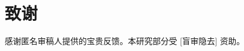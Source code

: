 \documentclass[conference,compsoc]{IEEEtran}
\begin{document}










\section*{致谢}

感谢匿名审稿人提供的宝贵反馈。本研究部分受 [盲审隐去] 资助。

{\scriptsize


}








\end{document}

